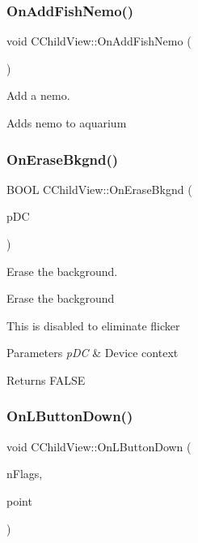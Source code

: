 \subsubsection{\texorpdfstring{On\+Add\+Fish\+Nemo()}{OnAddFishNemo()}}
{\footnotesize\ttfamily void C\+Child\+View\+::\+On\+Add\+Fish\+Nemo (\begin{DoxyParamCaption}{ }\end{DoxyParamCaption})}



Add a nemo. 

Adds nemo to aquarium \mbox{\label{class_c_child_view_a6060e6d09d522d345dcee5a01d41c1f0}} 
\subsubsection{\texorpdfstring{On\+Erase\+Bkgnd()}{OnEraseBkgnd()}}
{\footnotesize\ttfamily B\+O\+OL C\+Child\+View\+::\+On\+Erase\+Bkgnd (\begin{DoxyParamCaption}\item[{C\+DC $\ast$}]{p\+DC }\end{DoxyParamCaption})}



Erase the background. 

Erase the background

This is disabled to eliminate flicker 
\begin{DoxyParams}{Parameters}
{\em p\+DC} & Device context \\
\hline
\end{DoxyParams}
\begin{DoxyReturn}{Returns}
F\+A\+L\+SE 
\end{DoxyReturn}
\mbox{\label{class_c_child_view_af513a57c45ce8b9dcc09dd934e228534}} 
\subsubsection{\texorpdfstring{On\+L\+Button\+Down()}{OnLButtonDown()}}
{\footnotesize\ttfamily void C\+Child\+View\+::\+On\+L\+Button\+Down (\begin{DoxyParamCaption}\item[{U\+I\+NT}]{n\+Flags,  }\item[{C\+Point}]{point }\end{DoxyParamCaption})}



